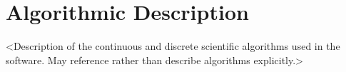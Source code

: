 
\section{Algorithmic Description}

<Description of the continuous and discrete scientific algorithms used
in the software.  May reference rather than describe algorithms explicitly.>












